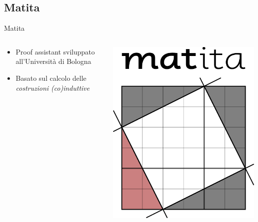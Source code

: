 \documentclass{beamer}
\begin{document}
\subsection{Matita}
\begin{frame}{Matita}
\begin{columns}
  \begin{column}{.5\textwidth}
    \begin{itemize}
      \item Proof assistant sviluppato all'Università di Bologna
      \vspace{1.5em}
      \item Basato sul calcolo delle \textit{costruzioni (co)induttive}
    \end{itemize}
  \end{column}
  \begin{column}{.5\textwidth}
    \begin{center}
        \includegraphics[scale=0.30]{matita.png}
    \end{center}
  \end{column}
\end{columns}
\end{frame}
\end{document}
